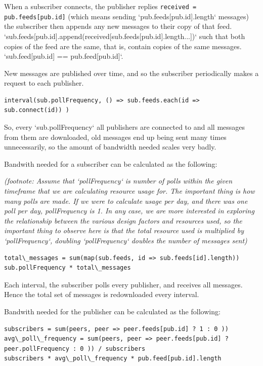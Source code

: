 \documentclass[sigconf]{acmart}
\begin{document}
When a subscriber connects, the publisher replies {\tt received =
pub.feeds[pub.id]} (which means sending `pub.feeds[pub.id].length`
messages) the subscriber then appends any new messages to their copy
of that feed.
`sub.feeds[pub.id].append(received[sub.feeds[pub.id].length...])` such
that both copies of the feed are the same, that is, contain copies of
the same messages. `sub.feed[pub.id] == pub.feed[pub.id]`.

New messages are published over time, and so the subscriber
periodically makes a request to each publisher.

\begin{verbatim}
interval(sub.pollFrequency, () => sub.feeds.each(id => sub.connect(id)) )
\end{verbatim}

So, every `sub.pollFrequency` all publishers are connected to and all
messages from them are downloaded, old messages end up being sent many
times unnecessarily, so the amount of bandwidth needed scales very
badly.

Bandwith needed for a subscriber can be calculated as the following:

{\em (footnote: Assume that `pollFrequency` is number of polls within
  the given timeframe that we are calculating resource usage for. The
  important thing is how many polls are made.  If we were to calculate
  usage per day, and there was one poll per day, pollFrequency is
  1. In any case, we are more interested in exploring the relationship
  between the various design factors and resources used, so the
  important thing to observe here is that the total resource used is
  {\em multiplied} by `pollFrequency`, doubling `pollFrequency`
  doubles the number of messages sent)}

\begin{verbatim}
total\_messages = sum(map(sub.feeds, id => sub.feeds[id].length))
sub.pollFrequency * total\_messages
\end{verbatim}
Each interval, the subscriber polls every publisher, and receives all
messages.  Hence the total set of messages is redownloaded every
interval.

Bandwith needed for the publisher can be calculated as the following:

\begin{verbatim}
subscribers = sum(peers, peer => peer.feeds[pub.id] ? 1 : 0 ))
avg\_poll\_frequency = sum(peers, peer => peer.feeds[pub.id] ? peer.pollFrequency : 0 )) / subscribers
subscribers * avg\_poll\_frequency * pub.feed[pub.id].length
\end{verbatim}
\end{document}
